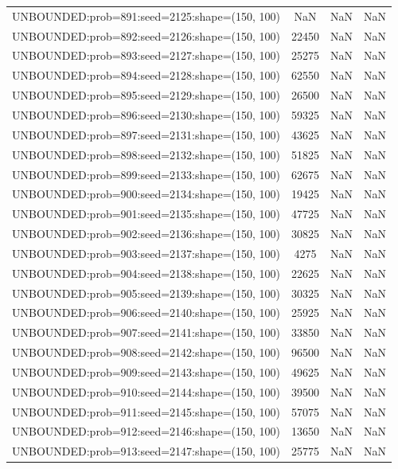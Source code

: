 \begin{longtable}{lccc}
UNBOUNDED:prob=891:seed=2125:shape=(150, 100) &   NaN &   NaN &    NaN \\
UNBOUNDED:prob=892:seed=2126:shape=(150, 100) & 22450 &   NaN &    NaN \\
UNBOUNDED:prob=893:seed=2127:shape=(150, 100) & 25275 &   NaN &    NaN \\
UNBOUNDED:prob=894:seed=2128:shape=(150, 100) & 62550 &   NaN &    NaN \\
UNBOUNDED:prob=895:seed=2129:shape=(150, 100) & 26500 &   NaN &    NaN \\
UNBOUNDED:prob=896:seed=2130:shape=(150, 100) & 59325 &   NaN &    NaN \\
UNBOUNDED:prob=897:seed=2131:shape=(150, 100) & 43625 &   NaN &    NaN \\
UNBOUNDED:prob=898:seed=2132:shape=(150, 100) & 51825 &   NaN &    NaN \\
UNBOUNDED:prob=899:seed=2133:shape=(150, 100) & 62675 &   NaN &    NaN \\
UNBOUNDED:prob=900:seed=2134:shape=(150, 100) & 19425 &   NaN &    NaN \\
UNBOUNDED:prob=901:seed=2135:shape=(150, 100) & 47725 &   NaN &    NaN \\
UNBOUNDED:prob=902:seed=2136:shape=(150, 100) & 30825 &   NaN &    NaN \\
UNBOUNDED:prob=903:seed=2137:shape=(150, 100) &  4275 &   NaN &    NaN \\
UNBOUNDED:prob=904:seed=2138:shape=(150, 100) & 22625 &   NaN &    NaN \\
UNBOUNDED:prob=905:seed=2139:shape=(150, 100) & 30325 &   NaN &    NaN \\
UNBOUNDED:prob=906:seed=2140:shape=(150, 100) & 25925 &   NaN &    NaN \\
UNBOUNDED:prob=907:seed=2141:shape=(150, 100) & 33850 &   NaN &    NaN \\
UNBOUNDED:prob=908:seed=2142:shape=(150, 100) & 96500 &   NaN &    NaN \\
UNBOUNDED:prob=909:seed=2143:shape=(150, 100) & 49625 &   NaN &    NaN \\
UNBOUNDED:prob=910:seed=2144:shape=(150, 100) & 39500 &   NaN &    NaN \\
UNBOUNDED:prob=911:seed=2145:shape=(150, 100) & 57075 &   NaN &    NaN \\
UNBOUNDED:prob=912:seed=2146:shape=(150, 100) & 13650 &   NaN &    NaN \\
UNBOUNDED:prob=913:seed=2147:shape=(150, 100) & 25775 &   NaN &    NaN \\

\end{longtable}
